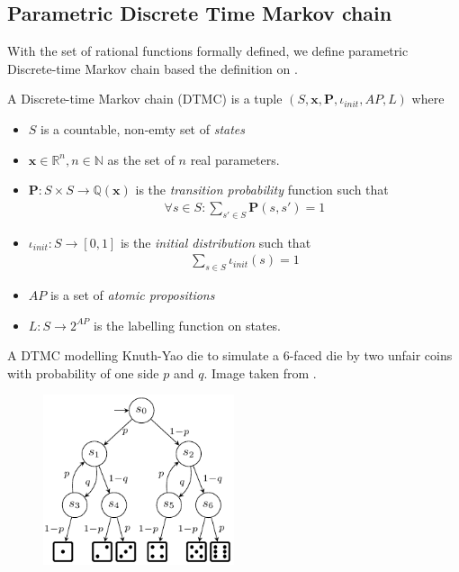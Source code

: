 \subsection{Parametric Discrete Time Markov chain}
With the set of rational functions formally defined, we define parametric Discrete-time Markov chain
based the definition on \cite{junges2019parameter}.
\begin{definition}
    A Discrete-time Markov chain (DTMC) is a tuple $(S, \mathbf{x}, \mathbf{P}, \iota_{init}, AP, L)$
    where
    \begin{itemize}
        \item $S$ is a countable, non-emty set of \textit{states}
        \item $\mathbf{x} \in \mathbb{R}^n, n \in \mathbb{N}$ as the set of $n$ real parameters.
        \item $\mathbf{P}:S\times S \rightarrow \mathbb{Q}(\mathbf{x})$ is the \textit{transition
                  probability} function such that
              \begin{align*}
                  \forall s \in S : \sum_{s'\in S}\mathbf{P}(s, s') = 1
              \end{align*}
        \item $\iota_{init}: S \rightarrow [0,1]$ is the \textit{initial distribution} such that
              \begin{align*}
                  \sum_{s\in S}\iota_{init}(s) = 1
              \end{align*}
        \item $AP$ is a set of \textit{atomic propositions}
        \item $L: S \rightarrow 2^{AP}$ is the labelling function on states.
    \end{itemize}
\end{definition}

\begin{example}
    A DTMC modelling Knuth-Yao die to simulate a 6-faced die by two unfair coins with probability of
    one side $p$ and $q$. Image taken from \cite{katoen2016probabilistic}.
    \begin{figure}[H]
        \centering
        \includegraphics[width=0.5\textwidth]{figures/knuth_die_pq.png}
        \label{fig:knuth-die-pq}
    \end{figure}
\end{example}

